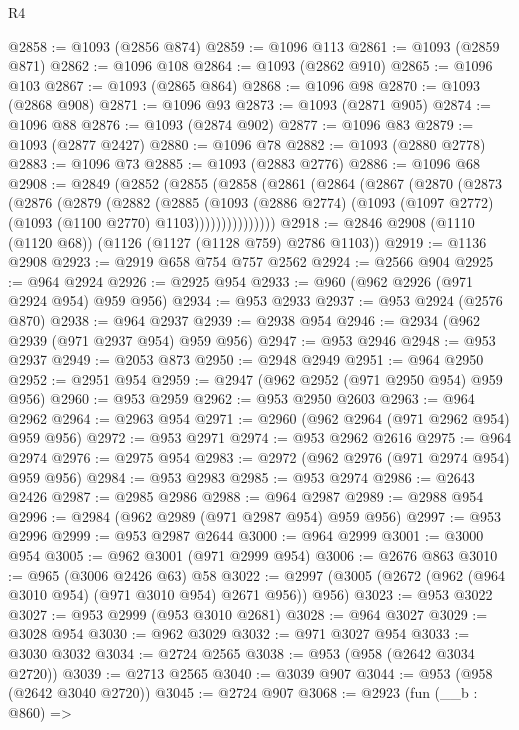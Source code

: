 \begin{lexlean}{R4}
\begin{coremodule}
@2858 := @1093 (@2856 @874)
@2859 := @1096 @113
@2861 := @1093 (@2859 @871)
@2862 := @1096 @108
@2864 := @1093 (@2862 @910)
@2865 := @1096 @103
@2867 := @1093 (@2865 @864)
@2868 := @1096 @98
@2870 := @1093 (@2868 @908)
@2871 := @1096 @93
@2873 := @1093 (@2871 @905)
@2874 := @1096 @88
@2876 := @1093 (@2874 @902)
@2877 := @1096 @83
@2879 := @1093 (@2877 @2427)
@2880 := @1096 @78
@2882 := @1093 (@2880 @2778)
@2883 := @1096 @73
@2885 := @1093 (@2883 @2776)
@2886 := @1096 @68
@2908 := @2849
    (@2852
      (@2855
        (@2858
          (@2861
            (@2864
              (@2867
                (@2870
                  (@2873
                    (@2876
                      (@2879
                        (@2882
                          (@2885
                            (@1093
                              (@2886 @2774)
                              (@1093 (@1097 @2772) (@1093 (@1100 @2770) @1103)))))))))))))))
@2918 := @2846 @2908 (@1110 (@1120 @68)) (@1126 (@1127 (@1128 @759) @2786 @1103))
@2919 := @1136 @2908
@2923 := @2919 @658 @754 @757 @2562
@2924 := @2566 @904
@2925 := @964 @2924
@2926 := @2925 @954
@2933 := @960 (@962 @2926 (@971 @2924 @954) @959 @956)
@2934 := @953 @2933
@2937 := @953 @2924 (@2576 @870)
@2938 := @964 @2937
@2939 := @2938 @954
@2946 := @2934 (@962 @2939 (@971 @2937 @954) @959 @956)
@2947 := @953 @2946
@2948 := @953 @2937
@2949 := @2053 @873
@2950 := @2948 @2949
@2951 := @964 @2950
@2952 := @2951 @954
@2959 := @2947 (@962 @2952 (@971 @2950 @954) @959 @956)
@2960 := @953 @2959
@2962 := @953 @2950 @2603
@2963 := @964 @2962
@2964 := @2963 @954
@2971 := @2960 (@962 @2964 (@971 @2962 @954) @959 @956)
@2972 := @953 @2971
@2974 := @953 @2962 @2616
@2975 := @964 @2974
@2976 := @2975 @954
@2983 := @2972 (@962 @2976 (@971 @2974 @954) @959 @956)
@2984 := @953 @2983
@2985 := @953 @2974
@2986 := @2643 @2426
@2987 := @2985 @2986
@2988 := @964 @2987
@2989 := @2988 @954
@2996 := @2984 (@962 @2989 (@971 @2987 @954) @959 @956)
@2997 := @953 @2996
@2999 := @953 @2987 @2644
@3000 := @964 @2999
@3001 := @3000 @954
@3005 := @962 @3001 (@971 @2999 @954)
@3006 := @2676 @863
@3010 := @965 (@3006 @2426 @63) @58
@3022 := @2997 (@3005 (@2672 (@962 (@964 @3010 @954) (@971 @3010 @954) @2671 @956)) @956)
@3023 := @953 @3022
@3027 := @953 @2999 (@953 @3010 @2681)
@3028 := @964 @3027
@3029 := @3028 @954
@3030 := @962 @3029
@3032 := @971 @3027 @954
@3033 := @3030 @3032
@3034 := @2724 @2565
@3038 := @953 (@958 (@2642 @3034 @2720))
@3039 := @2713 @2565
@3040 := @3039 @907
@3044 := @953 (@958 (@2642 @3040 @2720))
@3045 := @2724 @907
@3068 := @2923
    (fun (__b : @860) =>

\end{coremodule}
\end{lexlean}
